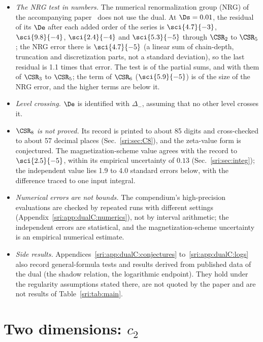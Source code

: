 \begin{itemize}
\item \emph{The NRG test in numbers.} The numerical renormalization group (NRG) of the accompanying
 paper~\cite{sri:Paper,sri:NRGnote} does not use the dual. At $\Ds=0.01$, the residual of its $\De$ after each added order
 of the series is $\sci{4.7}{-3}$, $\sci{9.8}{-4}$, $\sci{2.4}{-4}$ and $\sci{5.3}{-5}$ through $\CSR_2$ to $\CSR_5$;
 the NRG error there is $\sci{4.7}{-5}$ (a linear sum of chain-depth, truncation and discretization parts, not a
 standard deviation), so the last residual is 1.1 times that error. The test is of the partial sums, and with them of
 $\CSR_3$ to $\CSR_5$; the term of $\CSR_6$ ($\sci{5.9}{-5}$) is of the size of the NRG error, and the higher terms
 are below it.
\item \emph{Level crossing.} $\De$ is identified with $\Delta_-$, assuming that no other level crosses it.
\item \emph{$\CSR_8$ is not proved.} Its record is printed to about 85 digits and cross-checked to about 57 decimal
 places (Sec.~\ref{sri:sec:C8}), and the zeta-value form is conjectured. The magnetization-scheme value agrees with the
 record to $\sci{2.5}{-5}$, within its empirical uncertainty of $0.13$ (Sec.~\ref{sri:sec:integ}); the independent value
 lies 1.9 to 4.0 standard errors below, with the difference traced to one input integral.
\item \emph{Numerical errors are not bounds.} The compendium's high-precision evaluations are checked by repeated runs
 with different settings (Appendix~\ref{sri:app:dualC:numerics}), not by interval arithmetic; the independent errors are statistical, and the
 magnetization-scheme uncertainty is an empirical numerical estimate.
\item \emph{Side results.} Appendices~\ref{sri:app:dualC:conjectures} to~\ref{sri:app:dualC:logs} also record general-formula
 tests and results derived from published data of the dual (the shadow relation, the logarithmic endpoint). They hold
 under the regularity assumptions stated there, are not quoted by the paper and are not results of Table~\ref{sri:tab:main}.
\end{itemize}

\section{Two dimensions: \texorpdfstring{$c_2$}{c2}}\label{sri:sec:d2}
